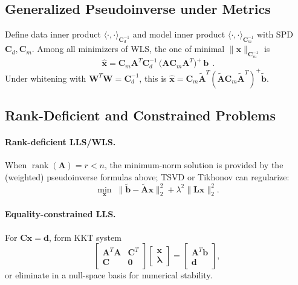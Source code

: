\documentclass[11pt,a4paper]{article}
\begin{document}
\subsection{Generalized Pseudoinverse under Metrics}
Define data inner product $\langle \cdot,\cdot\rangle_{\mathbf{C}_d^{-1}}$ and model inner product $\langle \cdot,\cdot\rangle_{\mathbf{C}_m^{-1}}$ with SPD $\mathbf{C}_d,\mathbf{C}_m$.
Among all minimizers of WLS, the one of minimal $\|\mathbf{x}\|_{\mathbf{C}_m^{-1}}$ is
\[
\boxed{\;\widehat{\mathbf{x}}=\mathbf{C}_m\mathbf{A}^T\mathbf{C}_d^{-1}\,\big(\mathbf{A}\mathbf{C}_m\mathbf{A}^T\big)^{+}\,\mathbf{b}\;}\,.
\]
Under whitening with $\mathbf{W}^T\mathbf{W}=\mathbf{C}_d^{-1}$, this is $\widehat{\mathbf{x}}=\mathbf{C}_m\tilde{\mathbf{A}}^T(\tilde{\mathbf{A}}\mathbf{C}_m\tilde{\mathbf{A}}^T)^+\tilde{\mathbf{b}}$.

\subsection{Rank-Deficient and Constrained Problems}
\paragraph{Rank-deficient LLS/WLS.} When $\operatorname{rank}(\mathbf{A})=r<n$, the minimum-norm solution is provided by the (weighted) pseudoinverse formulas above; TSVD or Tikhonov can regularize:
\[
\min_{\mathbf{x}}\; \|\tilde{\mathbf{b}}-\tilde{\mathbf{A}}\mathbf{x}\|_2^2 + \lambda^2\|\mathbf{L}\mathbf{x}\|_2^2.
\]
\paragraph{Equality-constrained LLS.} For $\mathbf{C}\mathbf{x}=\mathbf{d}$, form KKT system
\[
\begin{bmatrix}
\mathbf{A}^T\mathbf{A} & \mathbf{C}^T\\
\mathbf{C} & \mathbf{0}
\end{bmatrix}
\begin{bmatrix}
\mathbf{x}\\ \boldsymbol{\lambda}
\end{bmatrix}
=
\begin{bmatrix}
\mathbf{A}^T\mathbf{b}\\ \mathbf{d}
\end{bmatrix},
\]
or eliminate in a null-space basis for numerical stability.
\end{document}
